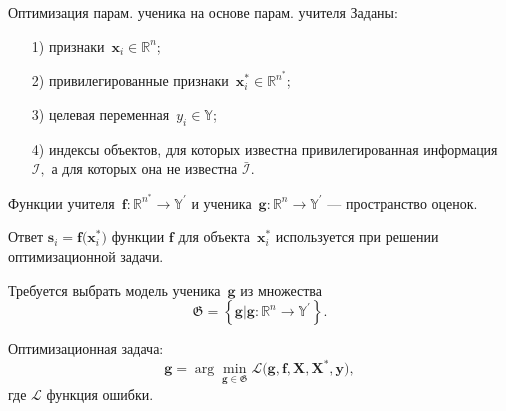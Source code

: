 \documentclass[10pt,pdf,hyperref={unicode}]{beamer}
\begin{document}
\begin{frame}{Оптимизация парам. ученика на основе парам. учителя}
\justifying
Заданы:
\begin{enumerate}
    \item[1)] признаки~$\mathbf{x}_i \in \mathbb{R}^{n}$;
    \item[2)] привилегированные признаки~$\mathbf{x}^*_i \in \mathbb{R}^{n^*}$;
    \item[3)] целевая переменная~$y_i \in \mathbb{Y}$;
    \item[4)] индексы объектов, для которых известна привилегированная информация $\mathcal{I},$ а для которых она не известна $\bar{\mathcal{I}}$.
\end{enumerate}

\bigskip

Функции учителя~$\mathbf{f}:\mathbb{R}^{n^*} \to \mathbb{Y}^\prime$ и ученика~$\mathbf{g}:\mathbb{R}^{n} \to \mathbb{Y}^\prime$ --- пространство оценок.

Ответ $\mathbf{s}_i = \mathbf{f}\bigr(\mathbf{x}_i^*\bigr)$ функции $\mathbf{f}$ для объекта~$\mathbf{x}^*_i$ используется при решении оптимизационной задачи.

\bigskip

Требуется выбрать модель ученика~$\mathbf{g}$ из множества
\[
	\mathfrak{G} = \left\{\mathbf{g}| \mathbf{g}:\mathbb{R}^{n} \to \mathbb{Y}^\prime\right\}.
\]

Оптимизационная задача:
\[
	\mathbf{g} = \arg\min_{\mathbf{g} \in \mathfrak{G}} \mathcal{L}\bigr(\mathbf{g}, \mathbf{f}, \mathbf{X}, \mathbf{X}^{*}, \mathbf{y}\bigr),
\]
где $\mathcal{L}$ функция ошибки.
\end{frame}
\end{document}
